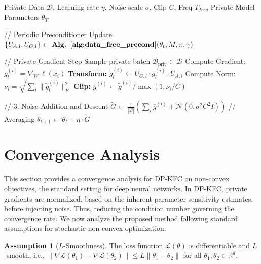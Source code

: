 \documentclass{article}
\theoremstyle{plain}
\theoremstyle{definition}
\newtheorem{assumption}[theorem]{Assumption}
\theoremstyle{remark}
\begin{document}
\begin{algorithm}[t]
\caption{DP-KFC Training Loop}
\label{alg:dp_kfac_loop}
\begin{algorithmic}[1]
 Private Data $\mathcal{D}$, Learning rate $\eta$, Noise scale $\sigma$, Clip $C$, Freq $T_{freq}$
 Private Model Parameters $\theta_T$

    \STATE \textcolor{auburn}{// Periodic Preconditioner Update}
        \STATE $\{U_{A,l}, U_{G,l}\} \gets \textbf{Alg. \ref{alg:data_free_precond}}(\theta_t, M, \pi, \gamma)$ 
    \ENDIF

    \STATE \textcolor{auburn}{// Private Gradient Step}
    \STATE Sample private batch $\mathcal{B}_{\text{priv}} \subset \mathcal{D}$
            \STATE Compute Gradient: $g_{l}^{(i)} = \nabla_{W_l} \ell(x_i)$
            \STATE \textbf{Transform:} $\tilde{g}_{l}^{(i)} \leftarrow U_{G,l} \cdot g_{l}^{(i)} \cdot U_{A,l}$
        \ENDFOR
        \STATE Compute Norm: $\nu_i = \sqrt{\sum_l \|\tilde{g}_{l}^{(i)}\|_F^2}$
        \STATE \textbf{Clip:} $\bar{g}^{(i)} \leftarrow \tilde{g}^{(i)} / \max(1, \nu_i/C)$
    \ENDFOR
    
    \STATE \textcolor{auburn}{// 3. Noise Addition and Descent}
    \STATE $\tilde{G} \leftarrow \frac{1}{|\mathcal{B}|} \left( \sum_i \bar{g}^{(i)} + \mathcal{N}(0, \sigma^2 C^2 I) \right)$ \hfill \textcolor{auburn}{// Averaging}
    \STATE $\theta_{t+1} \leftarrow \theta_t - \eta \cdot \tilde{G}$ 
\ENDFOR
\end{algorithmic}
\end{algorithm}

\section{Convergence Analysis}
\label{sec:convergence}

This section provides a convergence analysis for DP-KFC on non-convex objectives, the standard setting for deep neural networks. In DP-KFC, private gradients are normalized, based on the inherent parameter sensitivity estimates, before injecting noise. Thus, reducing the condition number governing the convergence rate. We now analyze the proposed method following standard assumptions for stochastic non-convex optimization.

\begin{assumption}[$L$-Smoothness]
\label{ass:smooth}
The loss function $\mathcal{L}(\theta)$ is differentiable and $L$-smooth, i.e., $\|\nabla \mathcal{L}(\theta_1) - \nabla \mathcal{L}(\theta_2)\| \le L \|\theta_1 - \theta_2\|$ for all $\theta_1, \theta_2 \in \mathbb{R}^d$.
\end{assumption}
\end{document}
